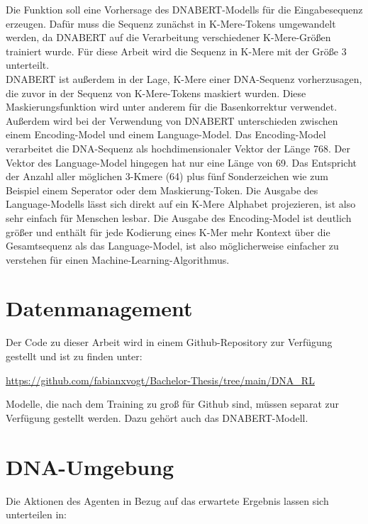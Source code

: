 \documentclass[oneside,bibliography=totocnumbered,BCOR=5mm]{scrbook}%
\theoremstyle{definition}
\theoremstyle{definition}
\theoremstyle{definition}
\theoremstyle{definition}
\theoremstyle{definition}
\theoremstyle{definition}
\begin{document}
Die Funktion soll eine Vorhersage des DNABERT-Modells für die Eingabesequenz erzeugen.
Dafür muss die Sequenz zunächst in K-Mere-Tokens umgewandelt werden, da DNABERT auf die Verarbeitung
verschiedener K-Mere-Größen trainiert wurde. 
Für diese Arbeit wird die Sequenz in K-Mere mit der Größe 3 unterteilt. \\

DNABERT ist außerdem in der Lage, K-Mere einer DNA-Sequenz vorherzusagen, die zuvor in der
Sequenz von K-Mere-Tokens maskiert wurden. Diese Maskierungsfunktion wird unter anderem für die 
Basenkorrektur verwendet. \\

Außerdem wird bei der Verwendung von DNABERT unterschieden zwischen einem Encoding-Model und einem Language-Model.
Das Encoding-Model verarbeitet die DNA-Sequenz als hochdimensionaler Vektor der Länge 768. 
Der Vektor des Language-Model hingegen hat nur eine Länge von 69. Das Entspricht der Anzahl aller möglichen
3-Kmere (64) plus fünf Sonderzeichen wie zum Beispiel einem Seperator oder dem Maskierung-Token.
Die Ausgabe des Language-Modells lässt sich direkt auf ein K-Mere Alphabet projezieren, 
ist also sehr einfach für Menschen lesbar. Die Ausgabe des Encoding-Model ist deutlich größer und
enthält für jede Kodierung eines K-Mer mehr Kontext über die Gesamtsequenz als das Language-Model,
ist also möglicherweise einfacher zu verstehen für einen Machine-Learning-Algorithmus.

\section{Datenmanagement}
Der Code zu dieser Arbeit wird in einem Github-Repository zur Verfügung gestellt und ist zu finden unter:\linebreak[4]

\url{https://github.com/fabianxvogt/Bachelor-Thesis/tree/main/DNA_RL}\linebreak[4]


Modelle, die nach dem Training zu groß für Github sind, müssen separat zur Verfügung gestellt werden.
Dazu gehört auch das DNABERT-Modell.


\section{DNA-Umgebung}

Die Aktionen des Agenten in Bezug auf das erwartete Ergebnis lassen sich unterteilen in:
\end{document}
